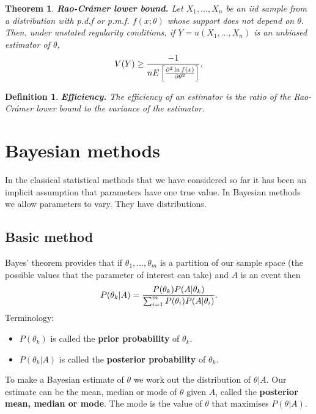 \documentclass[10pt, two column]{article}
\newtheorem{theorem}{Theorem}[subsection]
\newtheorem{definition}{Definition}[subsection]
\begin{document}
\begin{theorem}
{\bf Rao-Cr\'amer lower bound.} Let $X_{1}, \dots, X_{n}$ be an iid sample from a distribution with p.d.f or p.m.f. $f(x;\theta)$ whose support does not depend on $\theta$. Then, under unstated regularity conditions, if $Y = u(X_{1}, \dots, X_{n})$ is an unbiased estimator of $\theta$, \vspace{-6pt}
\[
V(Y) \geq \frac{-1}{nE\left[ \frac{\partial^{2} \ln f(x)}{\partial\theta^{2}} \right]}.
\vspace{+6pt} \]
\end{theorem}

\begin{definition} 
{\bf Efficiency.} The efficiency of an estimator is the ratio of the Rao-Cr\'amer lower bound to the variance of the estimator. 
\end{definition}

\section{Bayesian methods}

In the classical statistical methods that we have considered so far it has been an implicit assumption that parameters have one true value. In Bayesian methods we allow parameters to vary. They have distributions. 

\subsection{Basic method}

Bayes' theorem provides that if $\theta_{1}, \dots, \theta_{m}$ is a partition of our sample space (the possible values that the parameter of interest can take) and $A$ is an event then \vspace{-6pt}
\[
P(\theta_{k} \vert A) = \frac{P(\theta_{k}) P(A \vert \theta_{k})}{\sum_{i=1}^{m} P(\theta_{i}) P(A \vert \theta_{i})}. \vspace{-6pt}
\]
Terminology:
\begin{itemize}
\item $P(\theta_{k})$ is called the {\bf prior probability} of $\theta_{k}$. 
\item $P(\theta_{k} \vert A)$ is called the {\bf posterior probability} of $\theta_{k}$.
\end{itemize}
To make a Bayesian estimate of $\theta$ we work out the distribution of $\theta \vert A$. Our estimate can be the mean, median or mode of $\theta$ given $A$, called the {\bf posterior mean, median or mode}. The mode is the value of $\theta$ that maximises $P(\theta \vert A)$.
\end{document}
